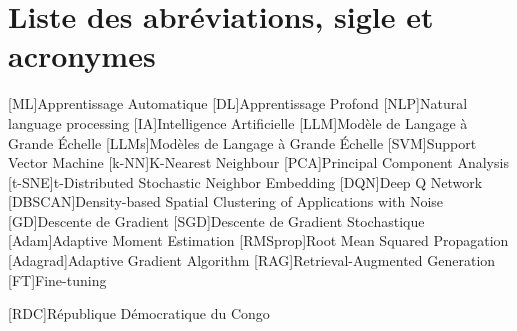 

\chapter*{Liste des abréviations, sigle et acronymes}

\begin{acronym}[LLM]
[ML]{Apprentissage Automatique}
[DL]{Apprentissage Profond}
[NLP]{Natural language processing}
[IA]{Intelligence Artificielle}
[LLM]{Modèle de Langage à Grande Échelle}
[LLMs]{Modèles de Langage à Grande Échelle}
[SVM]{Support Vector Machine}
[k-NN]{K-Nearest Neighbour}
[PCA]{Principal Component Analysis}
[t-SNE]{t-Distributed Stochastic Neighbor Embedding}
[DQN]{Deep Q Network}
[DBSCAN]{Density-based Spatial Clustering of Applications with Noise}
[GD]{Descente de Gradient}
[SGD]{Descente de Gradient Stochastique}
[Adam]{Adaptive Moment Estimation}
[RMSprop]{Root Mean Squared Propagation}
[Adagrad]{Adaptive Gradient Algorithm}
[RAG]{Retrieval-Augmented Generation}
[FT]{Fine-tuning}

[RDC]{République Démocratique du Congo}
\end{acronym}  
                   
\endgroup
